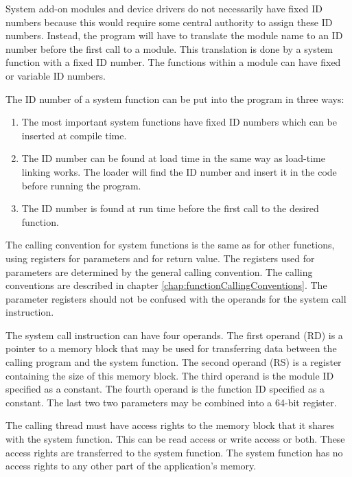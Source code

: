 \documentclass[forwardcom.tex]{subfiles}
\begin{document}
System add-on modules and device drivers do not necessarily have fixed ID numbers because this would require some central authority to assign these ID numbers. Instead, the program will have to translate the module name to an ID number before the first call to a module. This translation is done by a system function with a fixed ID number. The functions within a module can have fixed or variable ID numbers.
\vv

The ID number of a system function can be put into the program in three ways: 
\begin{enumerate}
\item The most important system functions have fixed ID numbers which can be inserted at compile time. 

\item The ID number can be found at load time in the same way as load-time linking works. 
The loader will find the ID number and insert it in the code before running the program. 

\item The ID number is found at run time before the first call to the desired function. 
\end{enumerate}

The calling convention for system functions is the same as for other functions, using registers for parameters and for return value. 
The registers used for parameters are determined by the general calling convention. 
The calling conventions are described in chapter \ref{chap:functionCallingConventions}.
The parameter registers should not be confused with the operands for the system call instruction. 
\vv

The system call instruction can have four operands. 
The first operand (RD) is a pointer to a memory block that may be used for transferring data between the calling program and the system function. The second operand (RS) is a register containing the size of this memory block.
The third operand is the module ID specified as a constant. 
The fourth operand is the function ID specified as a constant. 
The last two two parameters may be combined into a 64-bit register. 
\vv

The calling thread must have access rights to the memory block that it shares with the system 
function. This can be read access or write access or both. These access rights are transferred to the system function. The system function has no access rights to any other part of the application's memory.
\vv
\end{document}
